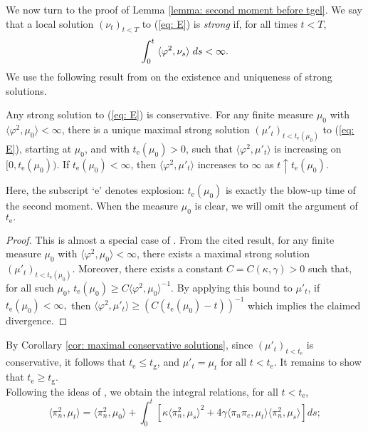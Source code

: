 We now turn to the proof of Lemma \ref{lemma: second moment before tgel}. We say that a local solution $(\nu_t)_{t<T}$ to (\ref{eq: E}) is \emph{strong} if, for all times $t<T$, 
\begin{equation}
    \int_0^t  \hspace{0.1cm} \langle\varphi^2, \nu_s\rangle  \hspace{0.1cm} ds<\infty.
\end{equation} We use the following result from \cite{N00} on the existence and uniqueness of strong solutions. 
\begin{lemma}\label{lemma: strong solutions} Any strong solution to (\ref{eq: E}) is conservative. For any finite measure $\mu_0$ with $\langle \varphi^2, \mu_0\rangle <\infty$, there is a unique maximal strong solution $(\mu'_t)_{t<t_\mathrm{e}(\mu_0)}$ to (\ref{eq: E}), starting at $\mu_0$, and with $t_\mathrm{e}(\mu_0)>0$, such that $ \langle \varphi^2, \mu'_t\rangle$ is increasing on $[0,t_\mathrm{e}(\mu_0))$. If $t_\mathrm{e}(\mu_0)<\infty$, then $\langle \varphi^2, \mu'_t\rangle$ increases to $\infty$  as $t\uparrow t_\mathrm{e}(\mu_0)$.  \end{lemma} Here, the subscript `e' denotes explosion: $t_\mathrm{e}(\mu_0)$ is exactly the blow-up time of the second moment. When the measure $\mu_0$ is clear, we will omit the argument of $t_\mathrm{e}.$ 
\begin{proof}
    This is almost a special case of \cite[Theorem 2.1]{N00}. From the cited result, for any finite measure $\mu_0$ with $\langle \varphi^2, \mu_0\rangle <\infty$, there exists a maximal strong solution $(\mu'_t)_{t<t_\mathrm{e}(\mu_0)}$. Moreover, there exists a constant $C=C(\kappa, \gamma)>0$ such that, for all such $\mu_0$,  $t_\mathrm{e}(\mu_0) \ge C \langle \varphi^2, \mu_0\rangle^{-1}$. By applying this bound to $\mu'_t$, if $t_\mathrm{e}(\mu_0)<\infty,$ then $\langle \varphi^2, \mu'_t\rangle \ge (C(t_\mathrm{e}(\mu_0)-t))^{-1}$  which implies the claimed divergence.
\end{proof}

By Corollary \ref{cor: maximal conservative solutions}, since $(\mu'_t)_{t<t_\mathrm{e}}$ is conservative, it follows that $t_\mathrm{e} \le t_\mathrm{g}$, and $\mu'_t=\mu_t$ for all $t<t_\mathrm{e}$. It remains to show that $t_\mathrm{e}\ge t_\mathrm{g}$. \medskip \\ Following the ideas of \cite[Proposition 2.7]{N00}, we obtain the integral relations, for all $t<t_\mathrm{e}$, \begin{equation} \label{eq: ODE1}
    \langle \pi_n^2, \mu_t\rangle =
    \langle \pi_n^2, \mu_0\rangle + \int_0^t \left[\kappa\langle \pi_n^2, \mu_s\rangle^2+4\gamma\langle \pi_n\pi_e, \mu_t\rangle\langle\pi_n^2, \mu_s\rangle \right] ds;
\end{equation} 

